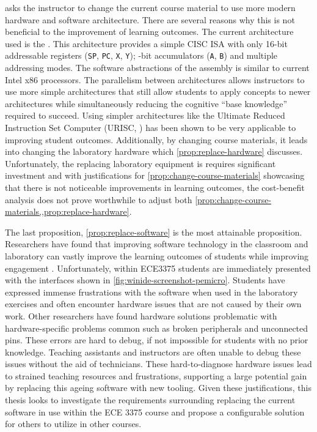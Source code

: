  asks the instructor to change the current course material to use more modern hardware and software architecture. There are several reasons why this is not beneficial to the improvement of learning outcomes. The current architecture used is the \hcmodel{}. This architecture provides a simple CISC ISA with only  16-bit addressable registers (\verb|SP|, \verb|PC|, \verb|X|, \verb|Y|);  -bit accumulators (\verb|A|, \verb|B|) and multiple addressing modes\cite{hc12Manual2006}. The software abstractions of the \hcmodel{} assembly is similar to current Intel\textregistered{} x86 processors\cite{intel2017}. The parallelism between architectures allows instructors to use more simple architectures that still allow students to apply concepts to newer architectures while simultaneously reducing the cognitive ``base knowledge'' required to succeed. Using simpler architectures like the Ultimate Reduced Instruction Set Computer (URISC, \cite{Mavaddat1988}) has been shown to be very applicable to improving student outcomes\cite{Nakamura2013, McLoughlin2010, Mavaddat1988, Djordjevic2005, Garcia2009}. Additionally, by changing course materials, it leads into changing the laboratory hardware which \cref{prop:replace-hardware} discusses. Unfortunately, the replacing laboratory equipment is requires significant investment and with justifications for \cref{prop:change-course-materials} showcasing that there is not noticeable improvements in learning outcomes, the cost-benefit analysis does not prove worthwhile to adjust both \cref{prop:change-course-materials,,prop:replace-hardware}.

The last proposition, \cref{prop:replace-software} is the most attainable proposition. Researchers have found that improving software technology in the classroom and laboratory can vastly improve the learning outcomes of students while improving engagement \cite{Ackovska2014, Stolikj2011, Ristov2011, Ristov2014, Nikolic2009, Skillen2011, Tappan2009, Djordjevic2005, cec2016}. Unfortunately, within ECE3375 students are immediately presented with the interfaces shown in \cref{fig:winide-screenshot-pemicro}. Students have expressed immense frustrations with the software when used in the laboratory exercises and often encounter hardware issues that are not caused by their own work\cite{evals:ece3375-2013, evals:ece3375-2014}. Other researchers have found hardware solutions problematic with hardware-specific problems common such as broken peripherals and unconnected pins\cite{Ackovska2014}. These errors are hard to debug, if not impossible for students with no prior knowledge. Teaching assistants and instructors are often unable to debug these issues without the aid of technicians. These hard-to-diagnose hardware issues lead to strained teaching resources and frustrations, supporting a large potential gain by replacing this ageing software with new tooling. Given these justifications, this thesis looks to investigate the requirements surrounding replacing the current software in use within the ECE 3375 course and propose a configurable solution for others to utilize in other courses. 

